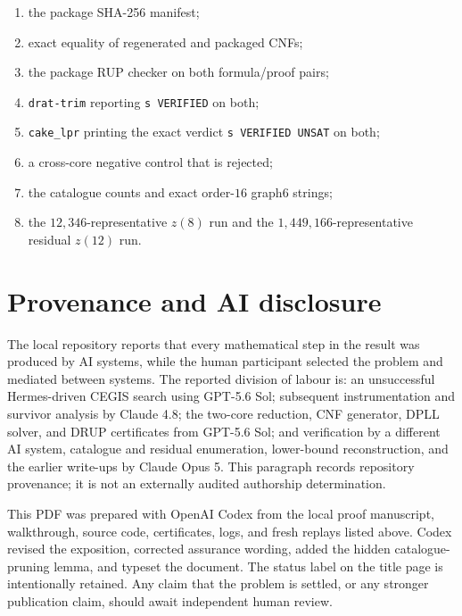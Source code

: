 \documentclass[11pt,a4paper]{article}
\theoremstyle{definition}
\theoremstyle{remark}
\begin{document}
\begin{enumerate}
  \item the package SHA-256 manifest;
  \item exact equality of regenerated and packaged CNFs;
  \item the package RUP checker on both formula/proof pairs;
  \item \texttt{drat-trim} reporting \texttt{s VERIFIED} on both;
  \item \texttt{cake\_lpr} printing the exact verdict
  \texttt{s VERIFIED UNSAT} on both;
  \item a cross-core negative control that is rejected;
  \item the catalogue counts and exact order-\(16\) graph6 strings;
  \item the \(12{,}346\)-representative \(z(8)\) run and the
  \(1{,}449{,}166\)-representative residual \(z(12)\) run.
\end{enumerate}

\section{Provenance and AI disclosure}

The local repository reports that every mathematical step in the result
was produced by AI systems, while the human participant selected the
problem and mediated between systems.  The reported division of labour is:
an unsuccessful Hermes-driven CEGIS search using GPT-5.6 Sol; subsequent
instrumentation and survivor analysis by Claude 4.8; the two-core reduction,
CNF generator, DPLL solver, and DRUP certificates from GPT-5.6 Sol; and
verification by a different AI system, catalogue and residual enumeration,
lower-bound reconstruction, and the earlier write-ups by Claude Opus 5.
This paragraph records repository provenance; it is not an externally
audited authorship determination.

This PDF was prepared with OpenAI Codex from the local proof manuscript,
walkthrough, source code, certificates, logs, and fresh replays listed
above.  Codex revised the exposition, corrected assurance wording, added
the hidden catalogue-pruning lemma, and typeset the document.  The status
label on the title page is intentionally retained.  Any claim that the
problem is settled, or any stronger publication claim, should await
independent human review.
\end{document}
